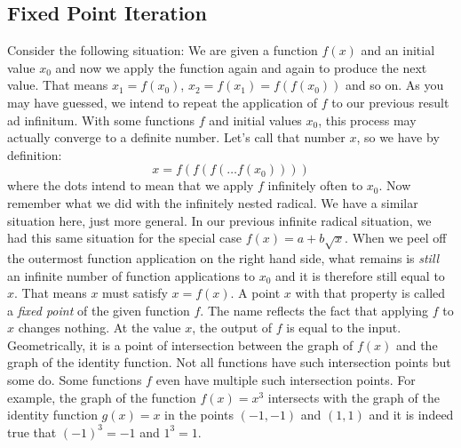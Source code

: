 \subsection{Fixed Point Iteration}
Consider the following situation: We are given a function $f(x)$ and an initial value $x_0$ and now we apply the function again and again to produce the next value. That means $x_1 = f(x_0)$, $x_2 = f(x_1) = f(f(x_0))$ and so on. As you may have guessed, we intend to repeat the application of $f$ to our previous result ad infinitum. With some functions $f$ and initial values $x_0$, this process may actually converge to a definite number. Let's call that number $x$, so we have by definition:
\begin{equation}
 x = f(f(f( \ldots f(x_0))))
\end{equation}
where the dots intend to mean that we apply $f$ infinitely often to $x_0$. Now remember what we did with the infinitely nested radical. We have a similar situation here, just more general. In our previous infinite radical situation, we had this same situation for the special case $f(x) = a + b \sqrt{x}$. When we peel off the outermost function application on the right hand side, what remains is \emph{still} an infinite number of function applications to $x_0$ and it is therefore still equal to $x$. That means $x$ must satisfy $x = f(x)$. A point $x$ with that property is called a \emph{fixed point} of the given function $f$. The name reflects the fact that applying $f$ to $x$ changes nothing. At the value $x$, the output of $f$ is equal to the input. Geometrically, it is a point of intersection between the graph of $f(x)$ and the graph of the identity function. Not all functions have such intersection points but some do. Some functions $f$ even have multiple such intersection points. For example, the graph of the function $f(x) = x^3$ intersects with the graph of the identity function $g(x) = x$ in the points $(-1,-1)$ and $(1,1)$ and it is indeed true that $(-1)^3 = -1$ and $1^3 = 1$.

%
%
%
%




